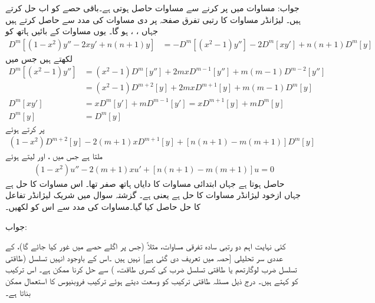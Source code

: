 جواب: مساوات  میں  پر کرنے سے  مساوات  حاصل ہوتی ہے۔باقی حصے کو اب حل کرتے ہیں۔
لیژانڈر مساوات  کا  رتبی تفرق صفحہ  پر دی مساوات  کی مدد سے حاصل کرتے ہیں جہاں ،  ،   ہو گا۔ یوں مساوات کے بائیں ہاتھ کو
\begin{align*}
D^m[(1-x^2)y''-2xy'+n(n+1)y]&=-D^m[(x^2-1)y'']-2D^m[xy']+n(n+1)D^m[y]
\end{align*}
لکھتے ہیں جس میں
\begin{align*}
D^m[(x^2-1)y'']&=(x^2-1)D^m[y'']+2mxD^{m-1}[y'']+m(m-1)D^{m-2}[y'']\\
&=(x^2-1)D^{m+2}[y]+2mxD^{m+1}[y]+m(m-1)D^m[y]\\
D^m[xy']&=xD^m[y']+mD^{m-1}[y']=xD^{m+1}[y]+mD^m[y]\\
D^m[y]&=D^m[y]
\end{align*}
پر کرتے ہوئے 
\begin{align*}
(1-x^2)D^{m+2}[y]-2(m+1)xD^{m+1}[y]+[n(n+1)-m(m+1)]D^m[y]
\end{align*}
ملتا ہے جس میں ،  اور  لیتے ہوئے  
\begin{align*}
(1-x^2)u''-2(m+1)xu'+[n(n+1)-m(m+1)]u=0
\end{align*}
حاصل ہوتا ہے جہاں ابتدائی مساوات کا دایاں ہاتھ صفر تھا۔ اس مساوات کا حل  ہے جہاں  ازخود لیژانڈر مساوات کا حل ہے یعنی  ہے۔ 
گزشتہ سوال میں شریک لیژانڈر تفاعل کا حل  حاصل کیا گیا۔مساوات  کی مدد سے اس کو لکھیں۔ 

جواب:

کئی نہایت اہم دو رتبی سادہ تفرقی مساوات، مثلاً  (جس پر اگلے حصے میں غور کیا جائے گا)، کے عددی سر تحلیلی [حصہ  میں تعریف دی گئی ہے] نہیں ہیں ۔اس کے باوجود انہیں تسلسل (طاقتی تسلسل ضرب لوگارتھم یا طاقتی تسلسل ضرب  کی کسری طاقت، ) سے حل کرنا ممکن ہے۔ اس ترکیب کو  کہتے ہیں۔ درج ذیل مسئلہ طاقتی ترکیب کو وسعت دیتے ہوئے ترکیب فروبنیوس کا استعمال ممکن بناتا ہے۔

